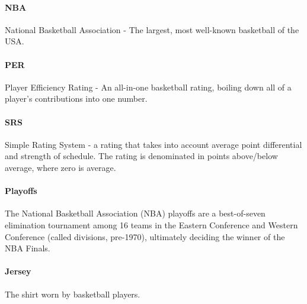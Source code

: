 \documentclass[chi_draft]{sigchi}
\begin{document}
\paragraph{NBA} National Basketball Association - The largest, most well-known
basketball of the USA.

\paragraph{PER} Player Efficiency Rating - An all-in-one basketball rating,
boiling down all of a player's contributions into one number\cite{per}.

\paragraph{SRS} Simple Rating System - a rating that takes into account average
point differential and strength of schedule. The rating is denominated in points
above/below average, where zero is average\cite{srs}. 

\paragraph{Playoffs} The National Basketball Association (NBA) playoffs are a
best-of-seven elimination tournament among 16 teams in the Eastern Conference
and Western Conference (called divisions, pre-1970), ultimately deciding the
winner of the NBA Finals\cite{playoffs}.

\paragraph{Jersey} The shirt worn by basketball players.
\end{document}
